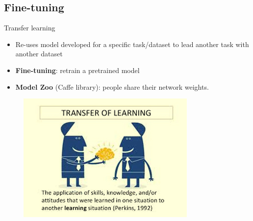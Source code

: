 \documentclass[10pt]{beamer}
\begin{document}
\subsection{Fine-tuning}
\begin{frame}{Transfer learning}{}
	\begin{itemize}
		\item Re-uses model developed for a specific task/dataset to lead another task with another dataset
		\item \textbf{Fine-tuning}: retrain a pretrained model
		\item \textbf{Model Zoo} (Caffe library): people share their network weights.
	\end{itemize}				
	\begin{center}
     \begin{figure}[htbp]
        \includegraphics[scale=.6]{images/transfer_learning}
    	\label{figrsexample1}
	\end{figure}
  \end{center}
\end{frame}
\end{document}
